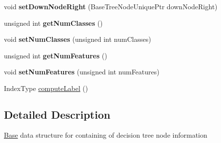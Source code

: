 \begin{DoxyCompactItemize}
\item 
\hypertarget{classffactory_1_1_base_tree_node_a1969bb07f5a3026dbdccde31a09855ff}{void {\bfseries set\-Down\-Node\-Right} (Base\-Tree\-Node\-Unique\-Ptr down\-Node\-Right)}\label{classffactory_1_1_base_tree_node_a1969bb07f5a3026dbdccde31a09855ff}

\item 
\hypertarget{classffactory_1_1_base_tree_node_a74514e2de80e29d91bdfd28a81546e42}{unsigned int {\bfseries get\-Num\-Classes} ()}\label{classffactory_1_1_base_tree_node_a74514e2de80e29d91bdfd28a81546e42}

\item 
\hypertarget{classffactory_1_1_base_tree_node_aa4fbb85a80728e3b37e3744b682e289c}{void {\bfseries set\-Num\-Classes} (unsigned int num\-Classes)}\label{classffactory_1_1_base_tree_node_aa4fbb85a80728e3b37e3744b682e289c}

\item 
\hypertarget{classffactory_1_1_base_tree_node_a0481a1cbd3d67cfa46fdd0756868b4e8}{unsigned int {\bfseries get\-Num\-Features} ()}\label{classffactory_1_1_base_tree_node_a0481a1cbd3d67cfa46fdd0756868b4e8}

\item 
\hypertarget{classffactory_1_1_base_tree_node_a67284d39d4bb9c587234e82e132402ee}{void {\bfseries set\-Num\-Features} (unsigned int num\-Features)}\label{classffactory_1_1_base_tree_node_a67284d39d4bb9c587234e82e132402ee}

\item 
Index\-Type \hyperlink{classffactory_1_1_base_tree_node_ab936c2d3ef94c6c3422f8fd488bcbce3}{compute\-Label} ()
\end{DoxyCompactItemize}


\subsection{Detailed Description}
\hyperlink{classffactory_1_1_base}{Base} data structure for containing of decision tree node information 

